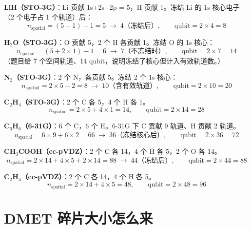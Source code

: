 \documentclass[11pt,a4paper]{article}
\begin{document}
\textbf{LiH（STO-3G）}：Li 贡献 1s+2s+2p = 5，H 贡献 1。冻结 Li 的 1s 核心电子（2 个电子占 1 个轨道）后：
\begin{equation}
  n_{\text{spatial}} = (5 + 1) - 1 = 5 \;\to\; 4 \text{（冻结后）}, \qquad \text{qubit} = 2 \times 4 = 8
\end{equation}

\textbf{H$_2$O（STO-3G）}：O 贡献 5，2 个 H 各贡献 1。冻结 O 的 1s 核心：
\begin{equation}
  n_{\text{spatial}} = (5 + 2 \times 1) - 1 = 6 \;\to\; 7 \text{（不冻结时）}, \qquad \text{qubit} = 2 \times 7 = 14
\end{equation}
（题目给 7 个空间轨道、14 qubit，说明冻结了核心但计入有效轨道数。）

\textbf{N$_2$（STO-3G）}：2 个 N，各贡献 5。冻结 2 个 1s 核心：
\begin{equation}
  n_{\text{spatial}} = 2 \times 5 - 2 = 8 \;\to\; 10 \text{（含有效轨道）}, \qquad \text{qubit} = 2 \times 10 = 20
\end{equation}

\textbf{C$_2$H$_4$（STO-3G）}：2 个 C 各 5，4 个 H 各 1。
\begin{equation}
  n_{\text{spatial}} = 2 \times 5 + 4 \times 1 = 14, \qquad \text{qubit} = 2 \times 14 = 28
\end{equation}

\textbf{C$_6$H$_6$（6-31G）}：6 个 C，6 个 H。6-31G 下 C 贡献 9 轨道、H 贡献 2 轨道。
\begin{equation}
  n_{\text{spatial}} = 6 \times 9 + 6 \times 2 = 66 \;\to\; 36 \text{（冻结核心后）}, \qquad \text{qubit} = 2 \times 36 = 72
\end{equation}

\textbf{CH$_3$COOH（cc-pVDZ）}：2 个 C 各 14，4 个 H 各 5，2 个 O 各 14。
\begin{equation}
  n_{\text{spatial}} = 2 \times 14 + 4 \times 5 + 2 \times 14 = 88 \;\to\; 44 \text{（冻结后）}, \qquad \text{qubit} = 2 \times 44 = 88
\end{equation}

\textbf{C$_2$H$_4$（cc-pVDZ）}：2 个 C 各 14，4 个 H 各 5。
\begin{equation}
  n_{\text{spatial}} = 2 \times 14 + 4 \times 5 = 48, \qquad \text{qubit} = 2 \times 48 = 96
\end{equation}

\section{DMET 碎片大小怎么来}
\end{document}
